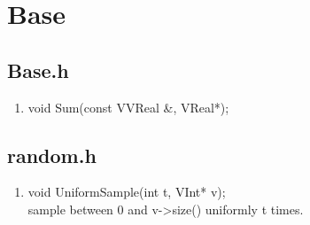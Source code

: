 \chapter{Base}
\section{Base.h}
\begin{enumerate}
\item void Sum(const VVReal \&, VReal*);
\end{enumerate}
\section{random.h}

\begin{enumerate}
\item void UniformSample(int t, VInt* v);
\\sample between 0 and v->size() uniformly t times.
\end{enumerate}
